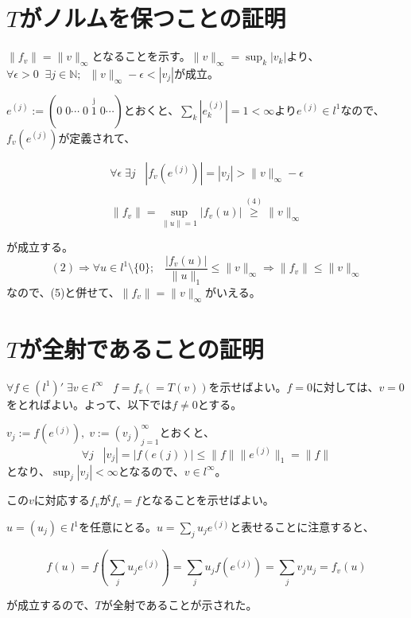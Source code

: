 \documentclass[11pt,a4paper]{article}
\begin{document}
\section{$T$がノルムを保つことの証明}

$\|f_v\| = \|v\|_{\infty}$となることを示す。$\|v\|_{\infty} = \sup_{k}\left|v_k\right|$より、$\forall \epsilon>0 \;\; \exists j \in \mathbb{N}; \;\; \|v\|_{\infty}-\epsilon < \left|v_j\right|$が成立。

$e^{(j)}:= (0 \; 0 \cdots \; 0 \; \overset{\textrm{j}}{1} \; 0 \cdots)$とおくと、$\displaystyle{\sum_{k}\left|e_k^{(j)}\right|} =1 <\infty$より$e^{(j)} \in l^1$なので、$f_v(e^{(j)})$が定義されて、

\begin{equation}
\forall \epsilon \; \exists j \;\;\; \left|f_v(e^{(j)})\right| = \left|v_j\right| > \|v\|_{\infty} - \epsilon
\end{equation}

\begin{equation}
\|f_v\| = \sup_{\|u\|=1}\left|f_v(u)\right| \overset{(4)}{\geq} \|v\|_{\infty}
\end{equation}

が成立する。
$$(2) \Rightarrow \forall u \in l^1 \setminus \{0\}; \;\;\; \frac{|f_v(u)|}{\|u\|_1} \leq \|v\|_{\infty} \Rightarrow \|f_v\| \leq \|v\|_{\infty}$$
なので、(5)と併せて、$\|f_v\| = \|v\|_{\infty}$がいえる。

\section{$T$が全射であることの証明}
$\forall f \in (l^1)'\; \exists v \in l^{\infty} \;\;\; f = f_v (=T(v))$を示せばよい。$f=0$に対しては、$v=0$をとればよい。よって、以下では$f \neq 0$とする。

$v_j := f(e^{(j)}), \; v:= (v_j)_{j=1}^{\infty}$とおくと、
$$ \forall j \;\;\; \left|v_j\right| = \left|f(e{(j)})\right| \leq \|f\| \|e^{(j)}\|_1 = \|f\| $$
となり、$\sup_j \left|v_j\right| < \infty $となるので、$v \in l^{\infty}$。

この$v$に対応する$f_v$が$f_v=f$となることを示せばよい。

$u = (u_j) \in l^1$を任意にとる。$u = \displaystyle{\sum_{j}u_je^{(j)}}$と表せることに注意すると、

$$
\displaystyle{f(u)=f(\sum_{j}u_je^{(j)}) = \sum_{j}u_jf(e^{(j)}) = \sum_{j}v_ju_j = f_v(u) }
$$

が成立するので、$T$が全射であることが示された。
\end{document}
